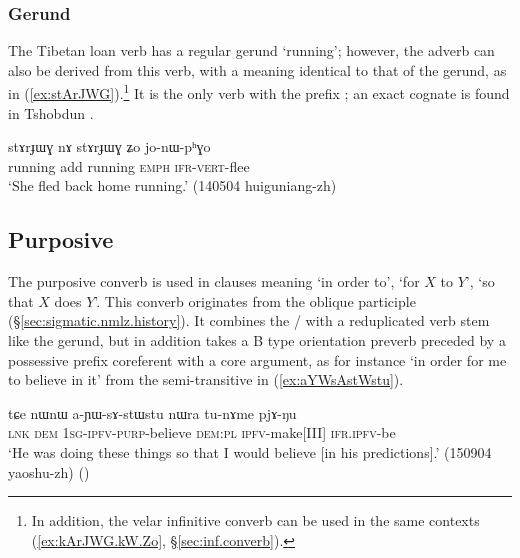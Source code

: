 \subsubsection{ Gerund} \label{sec:stArJWG}
The Tibetan loan verb  has a regular gerund  `running'; however, the adverb  can also be derived from this verb, with a meaning identical to that of the gerund, as in (\ref{ex:stArJWG}).\footnote{In addition, the velar infinitive converb  can be used in the same contexts (\ref{ex:kArJWG.kW.Zo}, §\ref{sec:inf.converb}). } It is the only verb with the prefix ; an exact cognate  is found in Tshobdun \citep[610]{jackson19tshobdun}.

\begin{exe}
\ex \label{ex:stArJWG}
\gll stɤrɟɯɣ nɤ stɤrɟɯɣ ʑo jo-nɯ-pʰɣo \\
running add running \textsc{emph} \textsc{ifr}-\textsc{vert}-flee \\
\glt `She fled back home running.' (140504 huiguniang-zh)
\end{exe}

 
\subsection{Purposive} \label{sec:purposive.converb}
The purposive converb is used in clauses meaning `in order to',  `for $X$ to $Y$', `so that $X$ does $Y$'. This converb originates from the oblique participle (§\ref{sec:sigmatic.nmlz.history}). It combines the / with a reduplicated verb stem like the gerund, but in addition takes a B type orientation preverb preceded by a possessive prefix coreferent with a core argument, as for instance  `in order for me to believe in it' from the semi-transitive  in (\ref{ex:aYWsAstWstu}). 

\begin{exe}
\ex \label{ex:aYWsAstWstu}
\gll  tɕe nɯnɯ a-ɲɯ-sɤ-stɯ\redp{}stu nɯra tu-nɤme pjɤ-ŋu \\
\textsc{lnk} \textsc{dem} \textsc{1sg}-\textsc{ipfv}-\textsc{purp}-believe \textsc{dem}:\textsc{pl} \textsc{ipfv}-make[III] \textsc{ifr}.\textsc{ipfv}-be \\
\glt `He was doing these things so that I would believe [in his predictions].' (150904 yaoshu-zh) ()
\end{exe}


